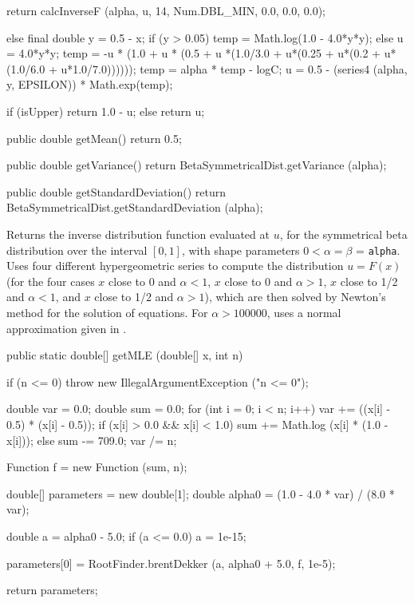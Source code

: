 \begin{code}
\begin{hide} {
      return calcInverseF (alpha, u, 14, Num.DBL_MIN, 0.0, 0.0, 0.0);
   }
{{{         } else {
            final double y = 0.5 - x;
            if (y > 0.05) {
               temp = Math.log(1.0 - 4.0*y*y);
            } else {
               u = 4.0*y*y;
               temp = -u * (1.0 + u * (0.5 + u *(1.0/3.0 + u*(0.25 +
                      u*(0.2 + u*(1.0/6.0 + u*1.0/7.0))))));
            }
            temp = alpha * temp - logC;
            u = 0.5 - (series4 (alpha, y, EPSILON)) * Math.exp(temp);
         }
      }

      if (isUpper)
         return 1.0 - u;
      else
         return u;
   }

   public double getMean() {
      return 0.5;
   }

   public double getVariance() {
      return BetaSymmetricalDist.getVariance (alpha);
   }

   public double getStandardDeviation() {
      return BetaSymmetricalDist.getStandardDeviation (alpha);
   }

\end{hide}\end{code}
\begin{tabb}
  Returns the inverse distribution function evaluated at $u$, for the
  symmetrical beta distribution over the interval $[0,1]$, with shape
  parameters $0 < \alpha = \beta$ = \texttt{alpha}.
  Uses four different hypergeometric series
  to compute the distribution $u = F(x)$
  (for the four cases $x$ close to 0 and $\alpha < 1$,
     $x$ close to 0 and $\alpha > 1$,  $x$ close to 1/2 and $\alpha < 1$,
  and  $x$ close to 1/2 and $\alpha > 1$),
  which are then solved by Newton's method for the solution of equations.
  For $\alpha > 100000$, uses a normal approximation given in \cite{tPEI68a}.
\end{tabb}
\begin{code}

   public static double[] getMLE (double[] x, int n)\begin{hide} {
      if (n <= 0)
         throw new IllegalArgumentException ("n <= 0");

      double var = 0.0;
      double sum = 0.0;
      for (int i = 0; i < n; i++)
      {
         var += ((x[i] - 0.5) * (x[i] - 0.5));
         if (x[i] > 0.0 && x[i] < 1.0)
            sum += Math.log (x[i] * (1.0 - x[i]));
         else
            sum -= 709.0;
      }
      var /= n;

      Function f = new Function (sum, n);

      double[] parameters = new double[1];
      double alpha0 = (1.0 - 4.0 * var) / (8.0 * var);

      double a = alpha0 - 5.0;
      if (a <= 0.0)
         a = 1e-15;

      parameters[0] = RootFinder.brentDekker (a, alpha0 + 5.0, f, 1e-5);

      return parameters;
   }\end{hide}
\end{code}
